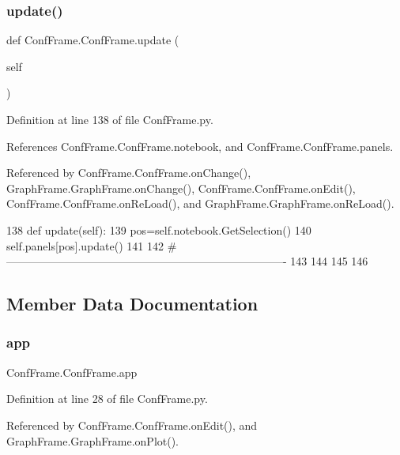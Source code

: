\subsubsection{\texorpdfstring{update()}{update()}}
{\footnotesize\ttfamily def Conf\+Frame.\+Conf\+Frame.\+update (\begin{DoxyParamCaption}\item[{}]{self }\end{DoxyParamCaption})}



Definition at line 138 of file Conf\+Frame.\+py.



References Conf\+Frame.\+Conf\+Frame.\+notebook, and Conf\+Frame.\+Conf\+Frame.\+panels.



Referenced by Conf\+Frame.\+Conf\+Frame.\+on\+Change(), Graph\+Frame.\+Graph\+Frame.\+on\+Change(), Conf\+Frame.\+Conf\+Frame.\+on\+Edit(), Conf\+Frame.\+Conf\+Frame.\+on\+Re\+Load(), and Graph\+Frame.\+Graph\+Frame.\+on\+Re\+Load().


\begin{DoxyCode}
138     \textcolor{keyword}{def }update(self):
139         pos=self.notebook.GetSelection()
140         self.panels[pos].update()
141         
142 \textcolor{comment}{#----------------------------------------------------------------------------}
143 
144 
145 
146 \end{DoxyCode}


\subsection{Member Data Documentation}
\mbox{\label{classConfFrame_1_1ConfFrame_a533aacde2742b806cb8e8161a5360796}} 
\subsubsection{\texorpdfstring{app}{app}}
{\footnotesize\ttfamily Conf\+Frame.\+Conf\+Frame.\+app}



Definition at line 28 of file Conf\+Frame.\+py.



Referenced by Conf\+Frame.\+Conf\+Frame.\+on\+Edit(), and Graph\+Frame.\+Graph\+Frame.\+on\+Plot().

